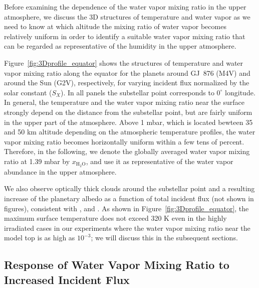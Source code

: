 \documentclass[11pt,numberedappendix,twocolappendix,]{emulateapj}
\def\water{H$_2$O}
\def\xwater{$x_\text{\water}$}
\def\preslevel{1.39 mbar}
\def\wv{water vapor}
\begin{document}
Before examining the dependence of the \wv{} mixing ratio in the upper atmosphere, we discuss the 3D structures of temperature and water vapor as we need to know at which altitude the mixing ratio of \wv{} becomes relatively uniform in order to identify a suitable \wv{} mixing ratio that can be regarded as representative of the humidity in the upper atmosphere. 

Figure~\ref{fig:3Dprofile_equator} shows the structures of temperature and  \wv{} mixing ratio along the equator for the planets around GJ~876 (M4V) and around the Sun (G2V), respectively, for varying incident flux normalized by the solar constant ($S_X$). 
In all panels the substellar point corresponds to $0^{\circ }$ longitude. 
In general, the temperature and the \wv{} mixing ratio near the surface strongly depend on the distance from the substellar point, but are fairly uniform in the upper part of the atmosphere. 
Above 1 mbar, which is located bewteen 35 and 50 km altitude depending on the atmospheric temperature profiles, the \wv{} mixing ratio becomes horizontally uniform within a few tens of percent. 
Therefore, in the following, we denote the globally averaged \wv{} mixing ratio at \preslevel{} by \xwater{}, and use it as representative of the \wv{} abundance in the upper atmosphere. 

We also observe optically thick clouds around the substellar point and a resulting increase of the planetary albedo as a function of total incident flux (not shown in figures), consistent with \citet{Yang2013,Yang2014}, \citet{Kopparapu2016} and \citet{Way2016}. 
As shown in Figure~\ref{fig:3Dprofile_equator}, the maximum surface temperature does not exceed 320 K even in the highly irradiated cases in our experiments where the \wv{} mixing ratio near the model top is as high as $10^{-3}$; we will discuss this in the subsequent sections. 


\subsection{Response of Water Vapor Mixing Ratio to Increased Incident Flux}
\label{ss:result_H2Omixingratio}
\end{document}
